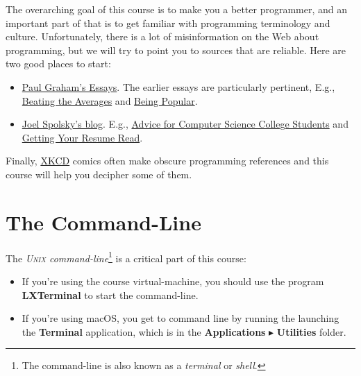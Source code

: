 \documentclass[9pt]{extbook}
\begin{document}
The overarching goal of this course is to make you a better programmer,
and an important part of that is to get familiar with programming terminology
and culture. Unfortunately, there is a lot of misinformation on the Web
about programming, but we will try to point you to sources that are reliable.
Here are two good places to start:
%
\begin{itemize}

  \item \href{http://paulgraham.com/articles.html}{Paul Graham's Essays}.
  The earlier essays are particularly pertinent, E.g.,
  \href{http://paulgraham.com/avg.html}{Beating the Averages} and
  \href{http://paulgraham.com/popular.html}{Being Popular}.

  \item \href{http://www.joelonsoftware.com}{Joel Spolsky's blog}. E.g.,
  \href{http://www.joelonsoftware.com/articles/CollegeAdvice.html}
  {Advice for Computer Science College Students}
  and \href{http://www.joelonsoftware.com/articles/ResumeRead.html}
  {Getting Your Resume Read}.

\end{itemize}

Finally, \href{http://xkcd.com}{XKCD} comics often make obscure programming
references and this course will help you decipher some of them.

\section{The Command-Line}

The \emph{\textsc{Unix} command-line}\footnote{The command-line is also known as a
\emph{terminal} or \emph{shell}.} is  a critical part of this course:

\begin{itemize}

\item If you're
using the course virtual-machine, you should use the program \textbf{LXTerminal}
to start the command-line.

\item If you're using macOS, you get to command line by running the
launching the \textbf{Terminal} application, which is in the
\textbf{Applications} $\blacktriangleright$ \textbf{Utilities} folder.



\end{itemize}
\end{document}
